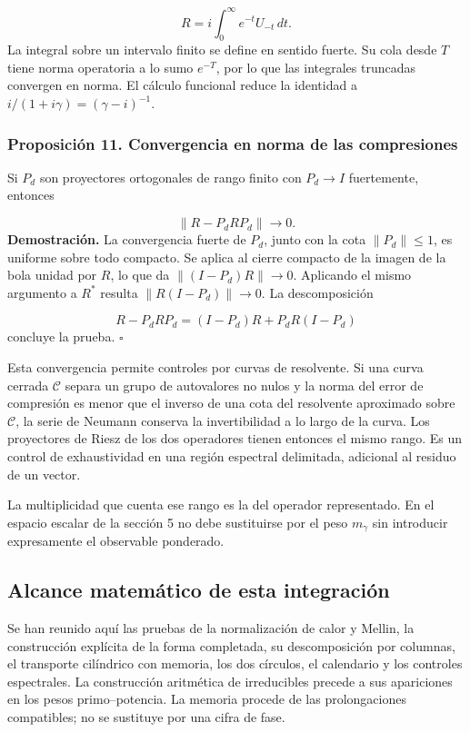 \[
R=i\int_0^\infty e^{-t}U_{-t}\,dt.
\]
La integral sobre un intervalo finito se define en sentido fuerte. Su cola desde \(T\) tiene norma operatoria a lo sumo \(e^{-T}\), por lo que las integrales truncadas convergen en norma. El cálculo funcional reduce la identidad a \(i/(1+i\gamma)=(\gamma-i)^{-1}\).

\subsubsection*{Proposición 11. Convergencia en norma de las compresiones}
Si \(P_d\) son proyectores ortogonales de rango finito con \(P_d\to I\) fuertemente, entonces

\[
\|R-P_dRP_d\|\longrightarrow0.
\]
\textbf{Demostración.} La convergencia fuerte de \(P_d\), junto con la cota \(\|P_d\|\leq1\), es uniforme sobre todo compacto. Se aplica al cierre compacto de la imagen de la bola unidad por \(R\), lo que da \(\|(I-P_d)R\|\to0\). Aplicando el mismo argumento a \(R^*\) resulta \(\|R(I-P_d)\|\to0\). La descomposición

\[
R-P_dRP_d=(I-P_d)R+P_dR(I-P_d)
\]
concluye la prueba. \hfill\(\square\)

Esta convergencia permite controles por curvas de resolvente. Si una curva cerrada \(\mathcal C\) separa un grupo de autovalores no nulos y la norma del error de compresión es menor que el inverso de una cota del resolvente aproximado sobre \(\mathcal C\), la serie de Neumann conserva la invertibilidad a lo largo de la curva. Los proyectores de Riesz de los dos operadores tienen entonces el mismo rango. Es un control de exhaustividad en una región espectral delimitada, adicional al residuo de un vector.

La multiplicidad que cuenta ese rango es la del operador representado. En el espacio escalar de la sección 5 no debe sustituirse por el peso \(m_\gamma\) sin introducir expresamente el observable ponderado.

\subsection{Alcance matemático de esta integración}
Se han reunido aquí las pruebas de la normalización de calor y Mellin, la construcción explícita de la forma completada, su descomposición por columnas, el transporte cilíndrico con memoria, los dos círculos, el calendario y los controles espectrales. La construcción aritmética de irreducibles precede a sus apariciones en los pesos primo–potencia. La memoria procede de las prolongaciones compatibles; no se sustituye por una cifra de fase.

